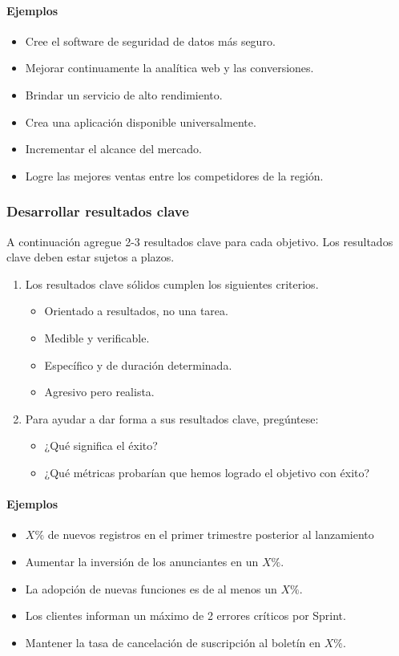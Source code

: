 \documentclass[10pt]{book}
\begin{document}
	    \paragraph{Ejemplos}
	    \begin{itemize}
		\item Cree el software de seguridad de datos más seguro.
		\item Mejorar continuamente la analítica web y las conversiones.
		\item Brindar un servicio de alto rendimiento.
		\item Crea una aplicación disponible universalmente.
		\item Incrementar el alcance del mercado.
		\item Logre las mejores ventas entre los competidores de la región.
	    \end{itemize}

	\subsubsection{Desarrollar resultados clave}
	A continuación agregue 2-3 resultados clave para cada objetivo. Los resultados clave deben estar sujetos a plazos.
	\begin{enumerate}[\bfseries 1.]
	\item Los resultados clave sólidos cumplen los siguientes criterios.
	\begin{itemize}
	    \item Orientado a resultados, no una tarea.
	    \item Medible y verificable.
	    \item Específico y de duración determinada.
	    \item Agresivo pero realista.
	\end{itemize}
	
	\item Para ayudar a dar forma a sus resultados clave, pregúntese:
	\begin{itemize}
	    \item ¿Qué significa el éxito?
	    \item ¿Qué métricas probarían que hemos logrado el objetivo con éxito?
	\end{itemize}
	\end{enumerate}

	    \paragraph{Ejemplos}
	    \begin{itemize}
		\item $X\%$ de nuevos registros en el primer trimestre posterior al lanzamiento
		\item Aumentar la inversión de los anunciantes en un $X\%$.
		\item La adopción de nuevas funciones es de al menos un $X\%$. 
		\item Los clientes informan un máximo de 2 errores críticos por Sprint.
		\item Mantener la tasa de cancelación de suscripción al boletín en $X\%$.
	    \end{itemize}
\end{document}
